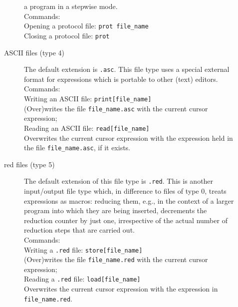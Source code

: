 \begin{description}
\begin{description}
 a program in a stepwise mode.\\$\;$\\
Commands:\\$\;$\\
Opening a protocol file: {\tt prot file\_name}\\
Closing a protocol file: {\tt prot}\\ 
\item[{\rm ASCII files (type 4)}]$\;$\\
The default extension is {\tt .asc}. This file type uses a special 
external format for \kir expressions which is portable to 
other (text) editors.\\$\;$\\
Commands:\\$\;$\\
Writing an ASCII file: {\tt print[file\_name]}\\
(Over)writes the file {\tt file\_name.asc} with the current cursor expression;\\$\;$\\
Reading an ASCII file: {\tt read[file\_name]}\\
Overwrites the current cursor expression with the expression held
in the file {\tt file\_name.asc}, if it exists.\\
\item[{\rm red files (type 5)}]$\;$\\
The default extension of this file type is {\tt .red}. This is another
input/output file type which, in difference to files of type 0, treats
\kir expressions as macros: reducing them, e.g., in the context of
a larger program into which they are being inserted, decrements the 
reduction counter by just one, irrespective of the actual number
of reduction steps that are carried out.\\$\;$\\
Commands:\\$\;$\\
Writing a {\tt .red} file: {\tt store[file\_name]}\\
(Over)writes the file {\tt file\_name.red} with the current cursor expression;\\$\;$\\
Reading a {\tt .red} file: {\tt load[file\_name]}\\
Overwrites the current cursor expression with the expression in
{\tt file\_name.red}.

\end{description}

\end{description}
